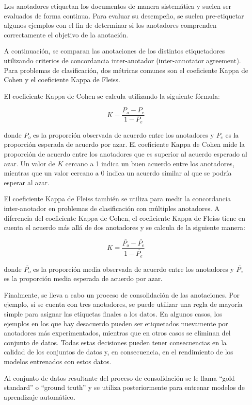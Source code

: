 Los anotadores etiquetan los documentos de manera sistemática y suelen ser evaluados de forma continua. Para evaluar su desempeño, se suelen pre-etiquetar algunos ejemplos con el fin de determinar si los anotadores comprenden correctamente el objetivo de la anotación.

A continuación, se comparan las anotaciones de los distintos etiquetadores utilizando criterios de concordancia inter-anotador (inter-annotator agreement). Para problemas de clasificación, dos métricas comunes son el coeficiente Kappa de Cohen y el coeficiente Kappa de Fleiss.

El coeficiente Kappa de Cohen se calcula utilizando la siguiente fórmula:

\[
K = \frac{P_o - P_e}{1 - P_e}
\]

donde \(P_o\) es la proporción observada de acuerdo entre los anotadores y \(P_e\) es la proporción esperada de acuerdo por azar. El coeficiente Kappa de Cohen mide la proporción de acuerdo entre los anotadores que es superior al acuerdo esperado al azar. Un valor de \(K\) cercano a 1 indica un buen acuerdo entre los anotadores, mientras que un valor cercano a 0 indica un acuerdo similar al que se podría esperar al azar.

El coeficiente Kappa de Fleiss también se utiliza para medir la concordancia inter-anotador en problemas de clasificación con múltiples anotadores. A diferencia del coeficiente Kappa de Cohen, el coeficiente Kappa de Fleiss tiene en cuenta el acuerdo más allá de dos anotadores y se calcula de la siguiente manera:

\[
K = \frac{\overline{P_o} - \overline{P_e}}{1 - \overline{P_e}}
\]

donde \(\overline{P_o}\) es la proporción media observada de acuerdo entre los anotadores y \(\overline{P_e}\) es la proporción media esperada de acuerdo por azar.

Finalmente, se lleva a cabo un proceso de consolidación de las anotaciones. Por ejemplo, si se cuenta con tres anotadores, se puede utilizar una regla de mayoría simple para asignar las etiquetas finales a los datos. En algunos casos, los ejemplos en los que hay desacuerdo pueden ser etiquetados nuevamente por anotadores más experimentados, mientras que en otros casos se eliminan del conjunto de datos. Todas estas decisiones pueden tener consecuencias en la calidad de los conjuntos de datos y, en consecuencia, en el rendimiento de los modelos entrenados con estos datos.

Al conjunto de datos resultante del proceso de consolidación se le llama ``gold standard'' o ``ground truth'' y se utiliza posteriormente para entrenar modelos de aprendizaje automático. 

